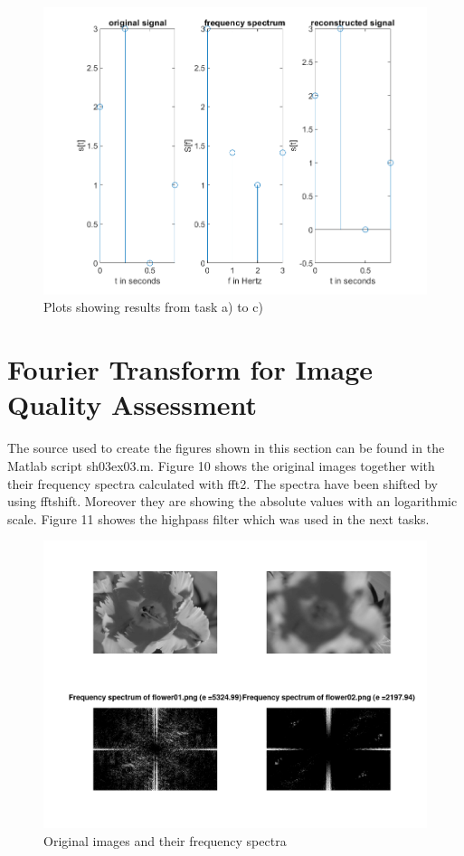 \documentclass[12pt,a4paper]{article}
\begin{document}
\begin{figure}[h]
	\begin{center}
		\includegraphics[scale=1.0]{./images/figure_d.png}
		\caption{Plots showing results from task a) to c)} 
	\end{center}
\end{figure}

\clearpage
\section{Fourier Transform for Image Quality Assessment}
The source used to create the figures shown in this section can be found in the Matlab script sh03ex03.m.
Figure 10 shows the original images together with their frequency spectra calculated with fft2. The spectra have been shifted by using fftshift. Moreover they are showing the absolute values with an logarithmic scale. Figure 11 showes the highpass filter which was used in the next tasks.

\begin{figure}[h]
	\begin{center}
		\includegraphics[scale=1.0]{./images/ex03_1.png}
		\caption{Original images and their frequency spectra} 
	\end{center}
\end{figure}
\end{document}
